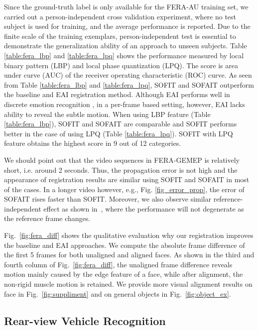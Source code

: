 \documentclass[10pt,journal]{IEEEtran}
\begin{document}
Since the ground-truth label is only available for the FERA-AU training set, we carried out a person-independent cross validation experiment, where no test subject is used for training, and the average performance is reported. Due to the finite scale of the training exemplars, person-independent test is essential to demonstrate the generalization ability of an approach to unseen subjects. Table \ref{table:fera_lbp} and \ref{table:fera_lpq} shows the performance measured by local binary pattern (LBP) and local phase quantization (LPQ). The score is area under curve (AUC) of the receiver operating characteristic (ROC) curve. As seen from Table \ref{table:fera_lbp} and \ref{table:fera_lpq}, SOFIT and SOFAIT outperform the baseline and EAI registration method. Although EAI performs well in discrete emotion recognition \cite{Yang_SMCB12}, in a per-frame based setting, however, EAI lacks ability to reveal the subtle motion. When using LBP feature (Table \ref{table:fera_lbp}), SOFIT and SOFAIT are comparable and SOFIT performs better in the case of using LPQ (Table \ref{table:fera_lpq}). SOFIT with LPQ feature obtains the highest score in 9 out of 12 categories. 

We should point out that the video sequences in FERA-GEMEP is relatively short, i.e. around 2 seconds. Thus, the propagation error is not high and the appearance of registration results are similar using SOFIT and SOFAIT in most of the cases. In a longer video however, e.g., Fig. \ref{fig_error_prop}, the error of SOFAIT rises faster than SOFIT. Moreover, we also observe similar reference-independent effect as shown in~\cite{Yang_FG13}, where the performance will not degenerate as the reference frame changes. 

Fig.~\ref{fig:fera_diff} shows the qualitative evaluation why our registration improves the baseline and EAI approaches. We compute the absolute frame difference of the first 5 frames for both unaligned and aligned faces. As shown in the third and fourth column of Fig.~\ref{fig:fera_diff}, the unaligned frame difference reveals motion mainly caused by the edge feature of a face, while after alignment, the non-rigid muscle motion is retained. We provide more visual alignment results on face in Fig.~\ref{fig:suppliment} and on general objects in Fig.~\ref{fig:object_ex}.



\subsection{Rear-view Vehicle Recognition}
\end{document}
